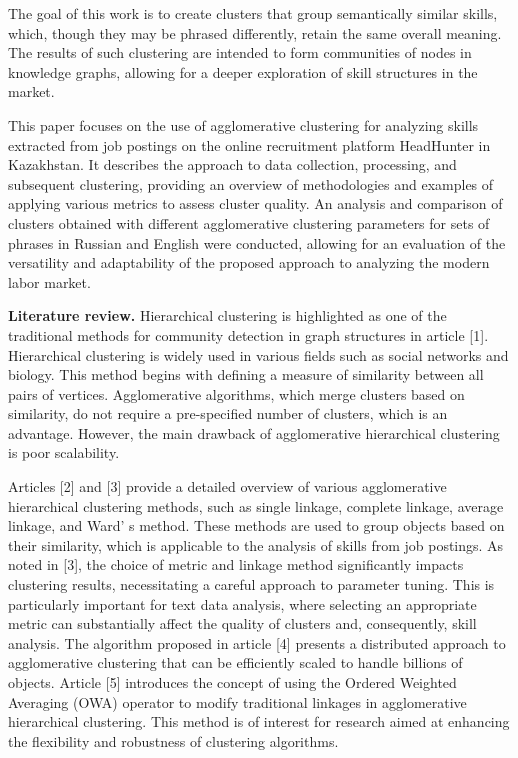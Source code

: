 The goal of this work is to create clusters that group semantically
similar skills, which, though they may be phrased differently, retain
the same overall meaning. The results of such clustering are intended to
form communities of nodes in knowledge graphs, allowing for a deeper
exploration of skill structures in the market.

This paper focuses on the use of agglomerative clustering for analyzing
skills extracted from job postings on the online recruitment platform
HeadHunter in Kazakhstan. It describes the approach to data collection,
processing, and subsequent clustering, providing an overview of
methodologies and examples of applying various metrics to assess cluster
quality. An analysis and comparison of clusters obtained with different
agglomerative clustering parameters for sets of phrases in Russian and
English were conducted, allowing for an evaluation of the versatility
and adaptability of the proposed approach to analyzing the modern labor
market.

{\bfseries Literature review.} Hierarchical clustering is highlighted as
one of the traditional methods for community detection in graph
structures in article {[}1{]}. Hierarchical clustering is widely used in
various fields such as social networks and biology. This method begins
with defining a measure of similarity between all pairs of vertices.
Agglomerative algorithms, which merge clusters based on similarity, do
not require a pre-specified number of clusters, which is an advantage.
However, the main drawback of agglomerative hierarchical clustering is
poor scalability.

Articles {[}2{]} and {[}3{]} provide a detailed overview of various
agglomerative hierarchical clustering methods, such as single linkage,
complete linkage, average linkage, and Ward' s method.
These methods are used to group objects based on their similarity, which
is applicable to the analysis of skills from job postings. As noted in
{[}3{]}, the choice of metric and linkage method significantly impacts
clustering results, necessitating a careful approach to parameter
tuning. This is particularly important for text data analysis, where
selecting an appropriate metric can substantially affect the quality of
clusters and, consequently, skill analysis. The algorithm proposed in
article {[}4{]} presents a distributed approach to agglomerative
clustering that can be efficiently scaled to handle billions of objects.
Article {[}5{]} introduces the concept of using the Ordered Weighted
Averaging (OWA) operator to modify traditional linkages in agglomerative
hierarchical clustering. This method is of interest for research aimed
at enhancing the flexibility and robustness of clustering algorithms.

